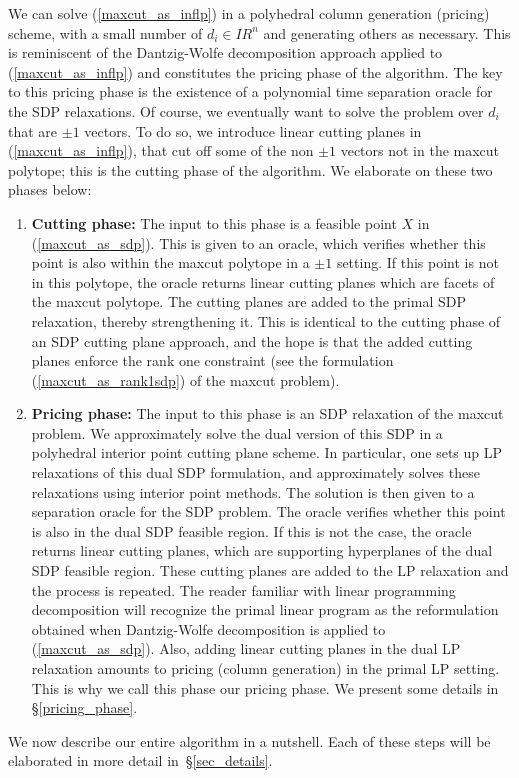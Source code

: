 \documentclass[12pt]{article}
\newcommand{\real}{I\!\!R}
\begin{document}
We can solve (\ref{maxcut_as_inflp}) in a polyhedral column
generation (pricing) scheme, with a small number of $d_i \in
\real^n$ and generating others as necessary. This is reminiscent
of the Dantzig-Wolfe decomposition approach applied to
(\ref{maxcut_as_inflp}) and constitutes the pricing phase of the
algorithm. The key to this pricing phase is the existence of a
polynomial time separation oracle for the SDP relaxations. Of
course, we eventually want to solve the problem over $d_i$ that
are $\pm 1$ vectors. To do so, we introduce linear cutting planes
in (\ref{maxcut_as_inflp}), that cut off some of the non $\pm 1$
vectors not in the maxcut polytope; this is the cutting phase of
the algorithm. We elaborate on these two phases below:
\begin{enumerate}
\item {\bf Cutting phase:} The input to this phase is a feasible
point $X$ in (\ref{maxcut_as_sdp}). This is given to an oracle,
which verifies whether this point is also within the maxcut
polytope in a $\pm 1$ setting. If this point is not in this
polytope, the oracle returns linear cutting planes which are
facets of the maxcut polytope. The cutting planes are added to the
primal SDP relaxation, thereby strengthening it. This is identical
to the cutting phase of an SDP cutting plane approach, and the
hope is that the added cutting planes enforce the rank one
constraint (see the formulation (\ref{maxcut_as_rank1sdp}) of the
maxcut problem). \item {\bf Pricing phase:} The input to this
phase is an SDP relaxation of the maxcut problem. We approximately
solve the dual version of this SDP in a polyhedral interior point
cutting plane scheme. In particular, one sets up LP relaxations of
this dual SDP formulation, and approximately solves these
relaxations using interior point methods. The solution is then
given to a separation oracle for the SDP problem. The oracle
verifies whether this point is also in the dual SDP feasible
region. If this is not the case, the oracle returns linear cutting
planes, which are supporting hyperplanes of the dual SDP feasible
region. These cutting planes are added to the LP relaxation and
the process is repeated. The reader familiar with linear
programming decomposition will recognize the primal linear program
as the reformulation obtained when Dantzig-Wolfe decomposition is
applied to (\ref{maxcut_as_sdp}). Also, adding linear cutting
planes in the dual LP relaxation amounts to pricing (column
generation) in the primal LP setting. This is why we call this
phase our pricing phase. We present some details in
\S\ref{pricing_phase}.
\end{enumerate}
We now describe our entire algorithm in a nutshell. Each of these
steps will be elaborated in more detail in~\S\ref{sec_details}.
\end{document}
